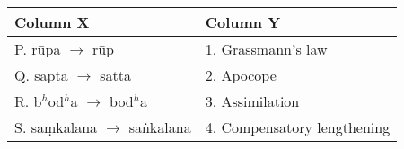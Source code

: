 \begin{tabular}{|l|l|}
        \hline
        Column X & Column Y \\
        \hline
        P. r\={u}pa $\rightarrow$ r\={u}p & 1. Grassmann's law \\
        Q. sapta $\rightarrow$ satta & 2. Apocope \\
        R. b$^h$od$^h$a $\rightarrow$ bod$^h$a & 3. Assimilation \\
        S. sa\d{m}kalana $\rightarrow$ sa\.{n}kalana & 4. Compensatory lengthening \\
        \hline
    \end{tabular}
